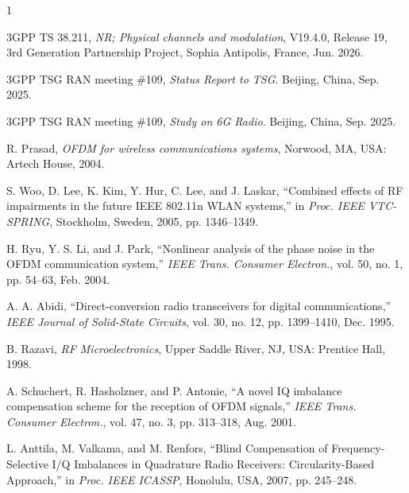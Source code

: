 \documentclass[lettersize,journal]{IEEEtran}
\begin{document}


\begin{thebibliography}{1}


3GPP TS 38.211, \emph{NR; Physical channels and modulation}, V19.4.0, Release 19, 3rd Generation Partnership Project, Sophia Antipolis, France, Jun. 2026.

3GPP TSG RAN meeting \#109, {\it{Status Report to TSG}}. Beijing, China, Sep. 2025.

3GPP TSG RAN meeting \#109, {\it{Study on 6G Radio}}. Beijing, China, Sep. 2025.

R. Prasad, {\it{OFDM for wireless communications systems}}, Norwood, MA, USA: Artech House, 2004.

S. Woo, D. Lee, K. Kim, Y. Hur, C. Lee, and J. Laskar, ``Combined effects of RF impairments in the future IEEE 802.11n WLAN systems,'' in \textit{Proc. IEEE VTC-SPRING}, Stockholm, Sweden, 2005, pp. 1346--1349.

H. Ryu, Y. S. Li, and J. Park, ``Nonlinear analysis of the phase noise in the OFDM communication system,'' \textit{IEEE Trans. Consumer Electron.}, vol. 50, no. 1, pp. 54--63, Feb. 2004.

A. A. Abidi, ``Direct-conversion radio transceivers for digital communications,'' \textit{IEEE Journal of Solid-State Circuits}, vol. 30, no. 12, pp. 1399--1410, Dec. 1995.

B. Razavi, {\it{RF Microelectronics}}, Upper Saddle River, NJ, USA: Prentice Hall, 1998.

A. Schuchert, R. Hasholzner, and P. Antonie, ``A novel IQ imbalance compensation scheme for the reception of OFDM signals,'' \textit{IEEE Trans. Consumer Electron.}, vol. 47, no. 3, pp. 313--318, Aug. 2001.

L. Anttila, M. Valkama, and M. Renfors, ``Blind Compensation of Frequency-Selective I/Q Imbalances in Quadrature Radio Receivers: Circularity-Based Approach,'' in \textit{Proc. IEEE ICASSP}, Honolulu, USA, 2007, pp. 245--248.


\end{thebibliography}
\end{document}

